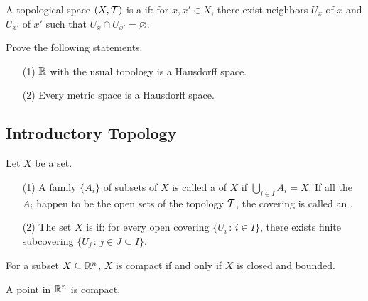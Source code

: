 \documentclass[a4paper, 10pt]{article}
\begin{document}
\begin{definition}
    A topological space $(X, \mathcal{T})$ is a  if: for $x, x' \in X$, there exist neighbors $U_{x}$ of $x$ and $U_{x'}$ of $x'$ such that $U_{x} \cap U_{x'} = \varnothing$.
\end{definition}

\begin{exercise}
    Prove the following statements.
    \begin{itemize}
        \item[(1)] $\mathbb{R}$ with the usual topology is a Hausdorff space.
        \item[(2)] Every metric space is a Hausdorff space.
    \end{itemize}
\end{exercise}

\subsection{Introductory Topology}

\begin{definition}[Compactness]
    Let $X$ be a set.
    \begin{itemize}
        \item[(1)] A family $\{A_{i}\}$ of subsets of $X$ is called a  of $X$ if $\displaystyle{\bigcup_{i \in I}A_{i} = X}$. If all the $A_{i}$ happen to be the open sets of the topology $\mathcal{T}$, the covering is called an .
        \item[(2)] The set $X$ is  if: for every open covering $\{ U_{i} \,:\, i \in I \}$, there exists finite subcovering $\{ U_{j} \,:\, j \in J \subseteq I \}$.
    \end{itemize}
\end{definition}

\begin{theorem}
    For a subset $X \subseteq \mathbb{R}^{n}$, $X$ is compact if and only if $X$ is closed and bounded.
\end{theorem}
\begin{remark}
    A point in $\mathbb{R}^{n}$ is compact.
\end{remark}
\newpage

\end{document}

